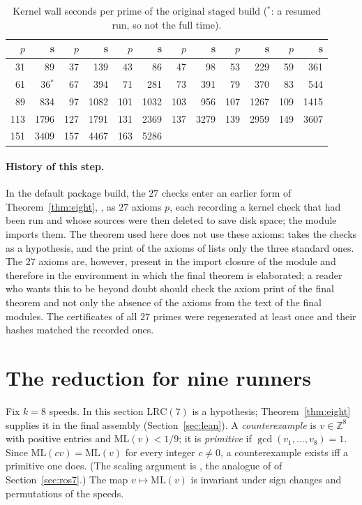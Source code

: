 \documentclass[11pt]{article}
\theoremstyle{remark}
\newcommand{\ML}{\mathrm{ML}}
\newcommand{\Z}{\mathbb{Z}}
\begin{document}
\begin{table}[ht]
\centering\small
\begin{tabular}{rrrrrrrrrrrr}
\toprule
$p$ & s & $p$ & s & $p$ & s & $p$ & s & $p$ & s & $p$ & s\\
\midrule
31 & 89 & 37 & 139 & 43 & 86 & 47 & 98 & 53 & 229 & 59 & 361\\
61 & 36$^\ast$ & 67 & 394 & 71 & 281 & 73 & 391 & 79 & 370 & 83 & 544\\
89 & 834 & 97 & 1082 & 101 & 1032 & 103 & 956 & 107 & 1267 & 109 & 1415\\
113 & 1796 & 127 & 1791 & 131 & 2369 & 137 & 3279 & 139 & 2959 & 149 & 3607\\
151 & 3409 & 157 & 4467 & 163 & 5286\\
\bottomrule
\end{tabular}
\caption{Kernel wall seconds per prime of the original staged build ($^\ast$: a resumed run, so not the full time).}\label{tab:eight}
\end{table}

\paragraph{History of this step.} In the default package build, the $27$ checks enter an earlier form of Theorem~\ref{thm:eight}, , as $27$ axioms $p$, each recording a kernel check that had been run and whose sources were then deleted to save disk space; the module  imports them. The theorem used here does not use these axioms:  takes the checks as a hypothesis, and the print of the axioms of  lists only the three standard ones. The $27$ axioms are, however, present in the import closure of the module  and therefore in the environment in which the final theorem is elaborated; a reader who wants this to be beyond doubt should check the axiom print of the final theorem and not only the absence of the axioms from the text of the final modules. The certificates of all $27$ primes were regenerated at least once and their hashes matched the recorded ones.

\section{The reduction for nine runners}\label{sec:red}

Fix $k=8$ speeds. In this section $\mathrm{LRC}(7)$ is a hypothesis; Theorem~\ref{thm:eight} supplies it in the final assembly (Section~\ref{sec:lean}). A \emph{counterexample} is $v\in\Z^8$ with positive entries and $\ML(v)<1/9$; it is \emph{primitive} if $\gcd(v_1,\dots,v_8)=1$. Since $\ML(cv)=\ML(v)$ for every integer $c\ne0$, a counterexample exists iff a primitive one does. (The scaling argument is , the analogue of  of Section~\ref{sec:ros7}.) The map $v\mapsto\ML(v)$ is invariant under sign changes and permutations of the speeds.
\end{document}
